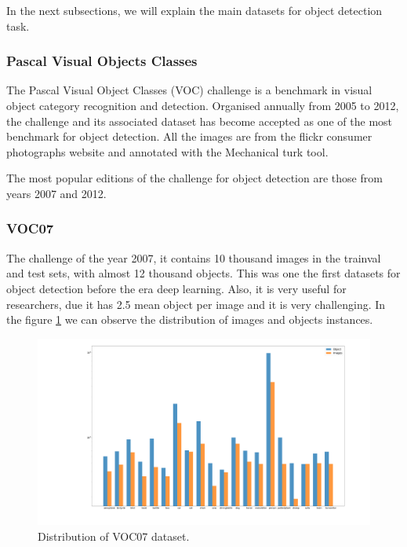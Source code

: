 \documentclass[12pt, a4paper, titlepage,twoside,openright]{article}
\begin{document}
In the next subsections, we will explain the main datasets for object detection task.


\subsubsection{Pascal Visual Objects Classes}

The Pascal Visual Object Classes (VOC) challenge  \cite{voc07} is a benchmark in visual object category recognition and detection. Organised annually from 2005 to 2012, the challenge and its associated dataset has become accepted as one of the most benchmark for object detection. All the images are from the flickr consumer photographs website and annotated with the Mechanical turk tool.

The most popular editions of the challenge for object detection are those from years 2007 and 2012.

\subsubsection{VOC07}


The challenge of the year 2007, it contains 10 thousand images in the trainval and test sets, with almost 12 thousand objects. This was one the first datasets for object detection before the era deep learning. Also, it is very useful for researchers, due it has 2.5 mean object per image and it is very challenging. In the figure \ref{data07} we can observe the distribution of images and objects instances. 

\begin{figure}[hptb]
\centering         
\includegraphics[width=0.7\linewidth]{datasets/log1.png}
\caption{Distribution of VOC07 dataset.} \label{data07}
\end{figure}
\end{document}
